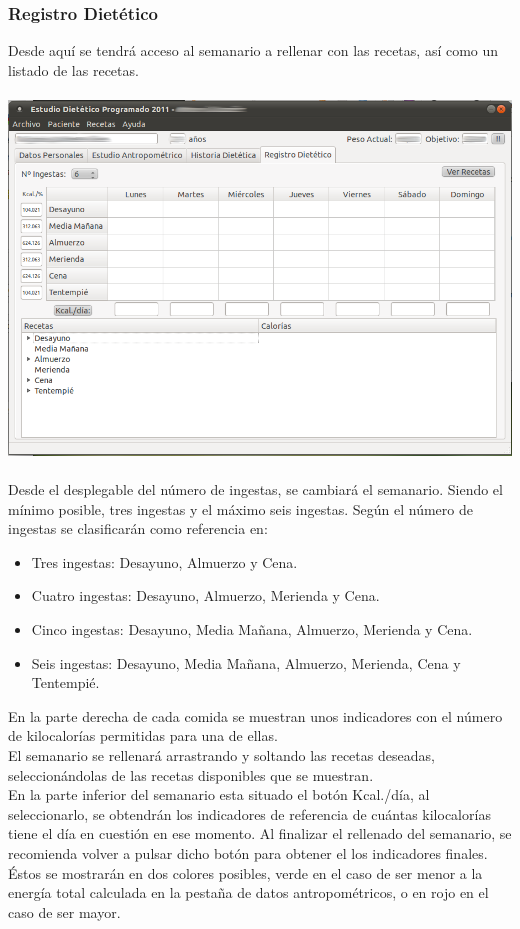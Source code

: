 \documentclass[12pt, spanish]{article}
\begin{document}
\subsubsection{Registro Dietético}
Desde aquí se tendrá acceso al semanario a rellenar con las recetas, así como un listado de las recetas.\\\\
\includegraphics[scale=0.5]{Image/paciente-registro.png}\\\\
Desde el desplegable del número de ingestas, se cambiará el semanario. Siendo el mínimo posible, tres ingestas y el máximo seis ingestas. Según el número de ingestas se clasificarán como referencia en:
\begin{itemize}
\item Tres ingestas: Desayuno, Almuerzo y Cena.
\item Cuatro ingestas: Desayuno, Almuerzo, Merienda y Cena.
\item Cinco ingestas: Desayuno, Media Mañana, Almuerzo, Merienda y Cena.
\item Seis ingestas: Desayuno, Media Mañana, Almuerzo, Merienda, Cena y Tentempié.
\end{itemize}
En la parte derecha de cada comida se muestran unos indicadores con el número de kilocalorías permitidas para una de ellas.\\
El semanario se rellenará arrastrando y soltando las recetas deseadas, seleccionándolas de las recetas disponibles que se muestran.\\
En la parte inferior del semanario esta situado el botón Kcal./día, al seleccionarlo, se obtendrán los indicadores de referencia de cuántas kilocalorías tiene el día en cuestión en ese momento. Al finalizar el rellenado del semanario, se recomienda volver a pulsar dicho botón para obtener el los indicadores finales. Éstos se mostrarán en dos colores posibles, verde en el caso de ser menor a la energía total calculada en la pestaña de datos antropométricos, o en rojo en el caso de ser mayor.\\\\
\end{document}
